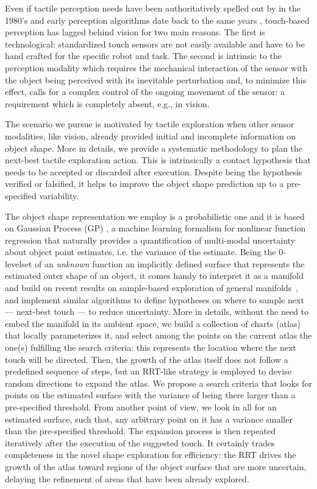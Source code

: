 Even if tactile perception needs have been authoritatively spelled out by \cite{Bajcsy1988Active} in the 1980's and early perception algorithms date back to the same years \citep{Grimson1984JRR,Faugeras1983IJCAI,Shekhar1986ICRA,Bajcsy1989Machine}, touch-based perception has lagged behind vision for two main reasons. The first is technological: standardized touch sensors are not easily available and have to be hand crafted for the specific robot and task. The second is intrinsic to the perception modality which requires the mechanical interaction of the sensor with the object being perceived with its inevitable perturbation and, to minimize this effect, calls for a complex control of the ongoing movement of the sensor: a requirement which is completely absent, e.g., in vision.

The scenario we pursue is motivated by tactile exploration when other sensor modalities, like vision, already provided initial and incomplete information on object shape. More in details, we provide a systematic methodology to plan the next-best tactile exploration action. This is intrinsically a contact hypothesis that needs to be accepted or discarded after execution. Despite being the hypothesis verified or falsified, it helps to improve the object shape prediction up to a pre-specified variability.

The object shape representation we employ is a probabilistic one and it is based on Gaussian Process (GP) \citep{Rasmussen2006Gaussian}, a machine learning formalism for nonlinear function regression that naturally provides a quantification of multi-modal uncertainty about object point estimates, i.e. the variance of the estimate. Being the $0$-levelset of an \emph{unknown} function an implicitly defined surface that represents the estimated outer shape of an object, it comes handy to interpret it as a manifold and build on recent results on sample-based exploration of general manifolds~\citep{Jaillet2013Path}, and implement similar algorithms to define hypotheses on where to sample next --- next-best touch --- to reduce uncertainty. More in details, without the need to embed the manifold in its ambient space, we build a collection of charts (atlas) that locally parameterizes it, and select among the points on the current atlas the one(s) fulfilling the search criteria: this represents the location where the next touch will be directed. Then, the growth of the atlas itself does not follow a predefined sequence of steps, but an RRT-like strategy is employed to devise random directions to expand the atlas. 
We propose a search criteria that looks for points on the estimated surface with the variance of being there larger than a pre-specified threshold. From another point of view, we look in all for an estimated surface, such that, any arbitrary point on it has a variance smaller than the pre-specified threshold. The expansion process is then repeated iteratively after the execution of the suggested touch. 
It certainly trades completeness in the novel shape exploration for efficiency: the RRT drives the growth of the atlas toward  regions of the object surface that are more uncertain, delaying the refinement of areas that have been already explored. 

